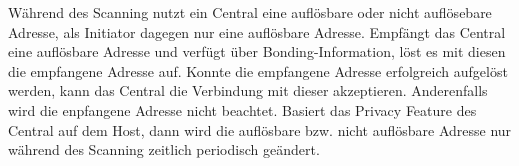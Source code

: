 Während des Scanning nutzt ein Central eine auflösbare oder nicht auflösebare Adresse, als Initiator dagegen nur eine auflösbare Adresse. Empfängt das Central eine auflösbare Adresse und verfügt über Bonding-Information, löst es mit diesen die empfangene Adresse auf. Konnte die empfangene Adresse erfolgreich aufgelöst werden, kann das Central die Verbindung mit dieser akzeptieren. Anderenfalls wird die enpfangene Adresse nicht beachtet. Basiert das Privacy Feature des Central auf dem Host, dann wird die auflösbare bzw. nicht auflösbare Adresse nur während des Scanning zeitlich periodisch geändert. \cite{BtSpec4.2_2078}
